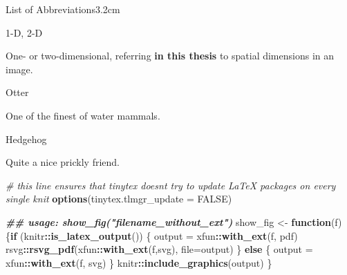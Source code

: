\documentclass[a4paper, nobind]{templates/ociamthesis}
\newenvironment{Shaded}{\begin{snugshade}}{\end{snugshade}}
\newcommand{\AttributeTok}[1]{\textcolor[rgb]{0.13,0.29,0.53}{#1}}
\newcommand{\CommentTok}[1]{\textcolor[rgb]{0.56,0.35,0.01}{\textit{#1}}}
\newcommand{\ConstantTok}[1]{\textcolor[rgb]{0.56,0.35,0.01}{#1}}
\newcommand{\ControlFlowTok}[1]{\textcolor[rgb]{0.13,0.29,0.53}{\textbf{#1}}}
\newcommand{\DocumentationTok}[1]{\textcolor[rgb]{0.56,0.35,0.01}{\textbf{\textit{#1}}}}
\newcommand{\FunctionTok}[1]{\textcolor[rgb]{0.13,0.29,0.53}{\textbf{#1}}}
\newcommand{\NormalTok}[1]{#1}
\newcommand{\OtherTok}[1]{\textcolor[rgb]{0.56,0.35,0.01}{#1}}
\newcommand{\SpecialCharTok}[1]{\textcolor[rgb]{0.81,0.36,0.00}{\textbf{#1}}}
\newcommand{\StringTok}[1]{\textcolor[rgb]{0.31,0.60,0.02}{#1}}
\renewenvironment{Shaded}
{
  \vspace{10pt}%
  \begin{snugshade}%
}{%
  \end{snugshade}%
  \vspace{8pt}%
}
\begin{document}
\begin{romanpages}
\begin{mclistof}{List of Abbreviations}{3.2cm}
\item[1-D, 2-D]

One- or two-dimensional, referring \textbf{in this thesis} to spatial dimensions in an image.

\item[Otter]

One of the finest of water mammals.

\item[Hedgehog]

Quite a nice prickly friend.

\end{mclistof} 


\end{romanpages}

\flushbottom

\begin{Shaded}
\begin{Highlighting}[]
\CommentTok{\# this line ensures that tinytex doesn\textquotesingle{}t try to update LaTeX packages on every single knit}
\FunctionTok{options}\NormalTok{(}\AttributeTok{tinytex.tlmgr\_update =} \ConstantTok{FALSE}\NormalTok{)}
\end{Highlighting}
\end{Shaded}

\begin{Shaded}
\begin{Highlighting}[]
\DocumentationTok{\#\# usage: show\_fig("filename\_without\_ext")}
\NormalTok{show\_fig }\OtherTok{\textless{}{-}} \ControlFlowTok{function}\NormalTok{(f)}
\NormalTok{  \{}\ControlFlowTok{if}\NormalTok{ (knitr}\SpecialCharTok{::}\FunctionTok{is\_latex\_output}\NormalTok{())}
\NormalTok{  \{}
\NormalTok{    output }\OtherTok{=}\NormalTok{ xfun}\SpecialCharTok{::}\FunctionTok{with\_ext}\NormalTok{(f, }\StringTok{\textquotesingle{}pdf\textquotesingle{}}\NormalTok{)}
\NormalTok{    rsvg}\SpecialCharTok{::}\FunctionTok{rsvg\_pdf}\NormalTok{(xfun}\SpecialCharTok{::}\FunctionTok{with\_ext}\NormalTok{(f,}\StringTok{\textquotesingle{}svg\textquotesingle{}}\NormalTok{), }\AttributeTok{file=}\NormalTok{output)}
\NormalTok{  \} }\ControlFlowTok{else}\NormalTok{ \{}
\NormalTok{    output }\OtherTok{=}\NormalTok{ xfun}\SpecialCharTok{::}\FunctionTok{with\_ext}\NormalTok{(f, }\StringTok{\textquotesingle{}svg\textquotesingle{}}\NormalTok{)}
\NormalTok{  \}}
\NormalTok{  knitr}\SpecialCharTok{::}\FunctionTok{include\_graphics}\NormalTok{(output)}
\NormalTok{\}}
\end{Highlighting}
\end{Shaded}
\end{document}
